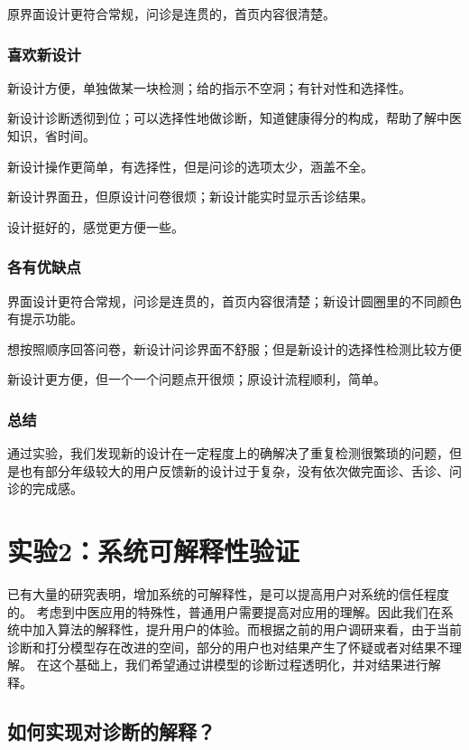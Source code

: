 原界面设计更符合常规，问诊是连贯的，首页内容很清楚。


\subsubsection{喜欢新设计}

新设计方便，单独做某一块检测；给的指示不空洞；有针对性和选择性。

新设计诊断透彻到位；可以选择性地做诊断，知道健康得分的构成，帮助了解中医知识，省时间。

新设计操作更简单，有选择性，但是问诊的选项太少，涵盖不全。

新设计界面丑，但原设计问卷很烦；新设计能实时显示舌诊结果。

设计挺好的，感觉更方便一些。


\subsubsection{各有优缺点}

界面设计更符合常规，问诊是连贯的，首页内容很清楚；新设计圆圈里的不同颜色有提示功能。

想按照顺序回答问卷，新设计问诊界面不舒服；但是新设计的选择性检测比较方便

新设计更方便，但一个一个问题点开很烦；原设计流程顺利，简单。

\subsubsection{总结}
通过实验，我们发现新的设计在一定程度上的确解决了重复检测很繁琐的问题，但是也有部分年级较大的用户反馈新的设计过于复杂，没有依次做完面诊、舌诊、问诊的完成感。

\section{实验2：系统可解释性验证}

已有大量的研究表明，增加系统的可解释性，是可以提高用户对系统的信任程度的。
考虑到中医应用的特殊性，普通用户需要提高对应用的理解。因此我们在系统中加入算法的解释性，提升用户的体验。而根据之前的用户调研来看，由于当前诊断和打分模型存在改进的空间，部分的用户也对结果产生了怀疑或者对结果不理解。
在这个基础上，我们希望通过讲模型的诊断过程透明化，并对结果进行解释。

\subsection{如何实现对诊断的解释？}

